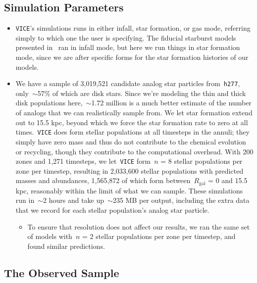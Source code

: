 \documentclass[a4paper, fleqn, usenatbib, useAMS]{mnras}
\begin{document}
\subsection{Simulation Parameters} 
\label{sec:methods:simparams} 

\begin{itemize} 
	\item \texttt{VICE}'s simulations runs in either infall, star formation, or 
	gas mode, referring simply to which one the user is specifying. The 
	fiducial starburst models presented in~\citet{Johnson2020} ran in infall 
	mode, but here we run things in star formation mode, since we are after 
	specific forms for the star formation histories of our models. 

	\item We have a sample of 3,019,521 candidate analog star particles 
	from~\texttt{h277}, only~$\sim$57\% of which are disk stars. Since we're 
	modeling the thin and thick disk populations here,~$\sim$1.72 million is a 
	much better estimate of the number of analogs that we can realistically 
	sample from. We let star formation extend out to 15.5 kpc, beyond which 
	we force the star formation rate to zero at all times.~\texttt{VICE} does 
	form stellar populations at all timesteps in the annuli; they simply have 
	zero mass and thus do not contribute to the chemical evolution or recycling, 
	though they contribute to the computational overhead. With 200 zones and 
	1,271 timesteps, we let~\texttt{VICE} form~$n$ = 8 stellar populations per 
	zone per timestep, resulting in 2,033,600 stellar populations with 
	predicted masses and abundances, 1,565,872 of which form 
	between~$R_\text{gal}$ = 0 and 15.5 kpc, reasonably within the limit of 
	what we can sample. These simulations run in~$\sim$2 hours and take 
	up~$\sim$235 MB per output, including the extra data that we record for 
	each stellar population's analog star particle. 
	\begin{itemize} 
		\item To ensure that resolution does not affect our results, we ran the 
		same set of models with~$n$ = 2 stellar populations per zone per 
		timestep, and found similar predictions. 
	\end{itemize} 
\end{itemize} 

\subsection{The Observed Sample} 
\label{sec:methods:observed_sample} 
\end{document}
